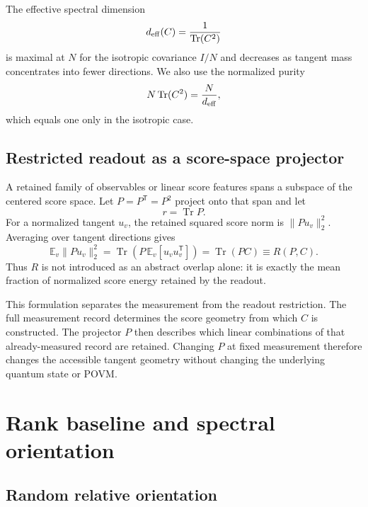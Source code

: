 \documentclass[aps,prx,reprint,superscriptaddress,nofootinbib,longbibliography]{revtex4-2}
\newcommand{\Tr}{\operatorname{Tr}}
\newcommand{\deff}{d_{\rm eff}}
\begin{document}
The effective spectral dimension
\begin{equation}
\deff(C)=\frac{1}{\Tr(C^2)}
\label{eq:deff}
\end{equation}
is maximal at $N$ for the isotropic covariance $I/N$ and decreases as tangent mass concentrates into fewer directions. We also use the normalized purity
\begin{equation}
N\Tr(C^2)=\frac{N}{\deff},
\label{eq:purity}
\end{equation}
which equals one only in the isotropic case.

\subsection{Restricted readout as a score-space projector}

A retained family of observables or linear score features spans a subspace of the centered score space. Let $P=P^{\mathsf T}=P^2$ project onto that span and let
\begin{equation}
r=\Tr P.
\end{equation}
For a normalized tangent $u_v$, the retained squared score norm is $\|Pu_v\|_2^2$. Averaging over tangent directions gives
\begin{equation}
\mathbb{E}_v\|Pu_v\|_2^2
=\Tr\!\left(P\,\mathbb{E}_v[u_vu_v^{\mathsf T}]\right)
=\Tr(PC)
\equiv R(P,C).
\label{eq:R-operational}
\end{equation}
Thus $R$ is not introduced as an abstract overlap alone: it is exactly the mean fraction of normalized score energy retained by the readout.

This formulation separates the measurement from the readout restriction. The full measurement record determines the score geometry from which $C$ is constructed. The projector $P$ then describes which linear combinations of that already-measured record are retained. Changing $P$ at fixed measurement therefore changes the accessible tangent geometry without changing the underlying quantum state or POVM.

\section{Rank baseline and spectral orientation}

\subsection{Random relative orientation}
\end{document}
